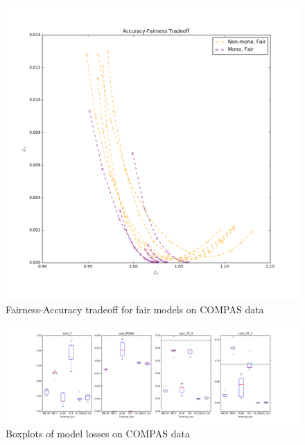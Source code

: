         \begin{figure}
            \centering
            \includegraphics[width=\textwidth]{fig_softmono/compas_tradeoffs_fair.png}
            \caption{Fairness-Accuracy tradeoff for fair models on COMPAS data}
            \label{fig:sm_compas_tradeoffs}
        \end{figure}
        
        \begin{figure}
            \centering
            \includegraphics[width=\textwidth]{fig_softmono/compas_boxplot.png}
            \caption{Boxplots of model losses on COMPAS data}
            \label{fig:sm_compas_boxplots}
        \end{figure}
        